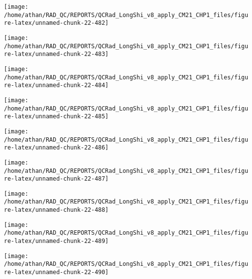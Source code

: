 \documentclass[
  10pt,
  a4paper,oneside]{article}
\begin{document}
\begin{center}\texttt{[image: /home/athan/RAD\_QC/REPORTS/QCRad\_LongShi\_v8\_apply\_CM21\_CHP1\_files/figure-latex/unnamed-chunk-22-482]} \end{center}

\begin{center}\texttt{[image: /home/athan/RAD\_QC/REPORTS/QCRad\_LongShi\_v8\_apply\_CM21\_CHP1\_files/figure-latex/unnamed-chunk-22-483]} \end{center}

\begin{center}\texttt{[image: /home/athan/RAD\_QC/REPORTS/QCRad\_LongShi\_v8\_apply\_CM21\_CHP1\_files/figure-latex/unnamed-chunk-22-484]} \end{center}

\begin{center}\texttt{[image: /home/athan/RAD\_QC/REPORTS/QCRad\_LongShi\_v8\_apply\_CM21\_CHP1\_files/figure-latex/unnamed-chunk-22-485]} \end{center}

\begin{center}\texttt{[image: /home/athan/RAD\_QC/REPORTS/QCRad\_LongShi\_v8\_apply\_CM21\_CHP1\_files/figure-latex/unnamed-chunk-22-486]} \end{center}

\begin{center}\texttt{[image: /home/athan/RAD\_QC/REPORTS/QCRad\_LongShi\_v8\_apply\_CM21\_CHP1\_files/figure-latex/unnamed-chunk-22-487]} \end{center}

\begin{center}\texttt{[image: /home/athan/RAD\_QC/REPORTS/QCRad\_LongShi\_v8\_apply\_CM21\_CHP1\_files/figure-latex/unnamed-chunk-22-488]} \end{center}

\begin{center}\texttt{[image: /home/athan/RAD\_QC/REPORTS/QCRad\_LongShi\_v8\_apply\_CM21\_CHP1\_files/figure-latex/unnamed-chunk-22-489]} \end{center}

\begin{center}\texttt{[image: /home/athan/RAD\_QC/REPORTS/QCRad\_LongShi\_v8\_apply\_CM21\_CHP1\_files/figure-latex/unnamed-chunk-22-490]} \end{center}
\end{document}
